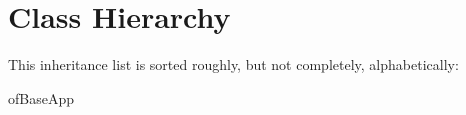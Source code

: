 \section{Class Hierarchy}
This inheritance list is sorted roughly, but not completely, alphabetically\-:\begin{DoxyCompactList}
\item {}
\item of\-Base\-App\begin{DoxyCompactList}
\item {}
\end{DoxyCompactList}
\end{DoxyCompactList}
